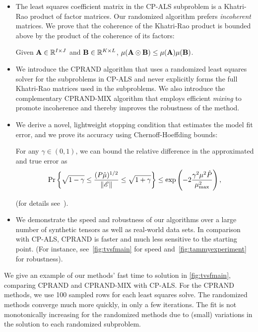 \begin{itemize}
\item 
The least squares coefficient matrix in the CP-ALS subproblem is a Khatri-Rao product of factor matrices. 
Our randomized algorithm prefers \emph{incoherent} matrices.
We prove that the coherence of the Khatri-Rao product is bounded 
above by the product of the coherence of its factors:
\begin{lemma} \label{lem:krp}
Given $\M{A} \in \mathbb{R}^{I \times J}$ and $\M{B} \in \mathbb{R}^{K \times L}$, $\mu(\M{A} \odot \M{B}) \leq \mu(\M{A})\mu(\M{B})$.
\end{lemma}
\item We introduce the CPRAND algorithm that uses a randomized least squares solver for the subproblems in CP-ALS and never explicitly forms the full Khatri-Rao matrices used in the subproblems.
We also introduce the complementary CPRAND-MIX algorithm that employs efficient \emph{mixing} to promote incoherence and thereby improves the robustness of the method.
\item We derive a novel, lightweight stopping condition that estimates
  the model fit error, and we prove its accuracy using Chernoff-Hoeffding bounds:
  \begin{lemma} For any $\gamma \in (0,1)$, we can bound the relative
  difference in the approximated and true error as
\begin{align*}
\Pr\left\{\sqrt{1-\gamma} \leq \frac{(P \hat \mu)^{1/2}}{\|\T{E}\|} \leq \sqrt{1+\gamma}\right\} \leq \exp\left(-2\frac{\gamma^2 \mu^2 \hat P}{\mu_{\text{max}}^2}\right),\\
\end{align*}
\end{lemma}
(for details see~\cite{caseyb}).
\item We demonstrate the speed and robustness of our algorithms over a
  large number of synthetic tensors as well as real-world data
  sets. In comparison with CP-ALS, CPRAND is faster and much less sensitive to
  the starting point. (For instance, see~\cref{fig:tvsfmain} for speed and~\cref{fig:tammyexperiment} for robustness).
\end{itemize}
We give an example of our methods' fast time to solution in \cref{fig:tvsfmain},
comparing CPRAND and CPRAND-MIX with CP-ALS.
For the CPRAND methods, we use 100 sampled rows for each least squares solve.
The randomized methods converge much more quickly, in only a few
iterations. 
The fit is not monotonically increasing for the randomized methods due
to (small) variations in the solution to each randomized subproblem.
